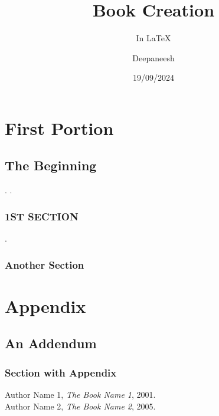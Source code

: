 \documentclass[fontsize= 11pt,paper=a5,pagesize=auto]{scrbook}
\begin{document}
	\title{Book Creation }
	\subtitle{In \LaTeX}
	\author{Deepaneesh}
	\date{19/09/2024}
	\maketitle
	\tableofcontents
	\part{First Portion}
	\chapter{The Beginning}
	\blindtext[1]. \cite{BK01}.
	\section{1ST SECTION}
	\blindtext[2] \cite{BK02}.
	\section{Another Section}
	\blindtext[3]
	\appendix
	\part{Appendix}
	\chapter{An Addendum}
	\section{Section with Appendix}
	\blindtext
	\begin{thebibliography}{4}
		 Author Name 1, \emph{The Book Name 1}, 2001.\\
		 Author Name 2, \emph{The Book Name 2}, 2005.
	\end{thebibliography}
\end{document}

